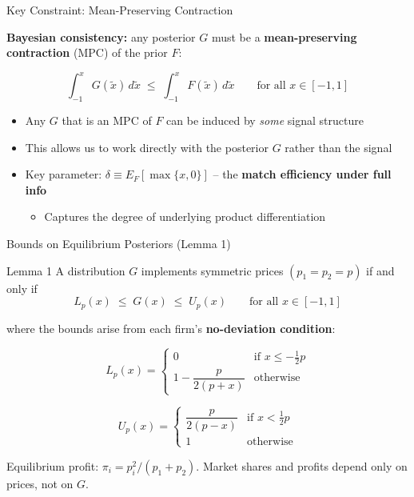 \documentclass[aspectratio=169, 11pt]{beamer}
\begin{document}
\begin{frame}{Key Constraint: Mean-Preserving Contraction}

\textbf{Bayesian consistency:} any posterior $G$ must be a \textbf{mean-preserving contraction} (MPC) of the prior $F$:

$$\int_{-1}^{x} G(\tilde{x})\, d\tilde{x} \;\leq\; \int_{-1}^{x} F(\tilde{x})\, d\tilde{x} \qquad \text{for all } x \in [-1,1]$$

\bigskip

\begin{itemize}
    \item Any $G$ that is an MPC of $F$ can be induced by \emph{some} signal structure

    \medskip

    \item This allows us to work directly with the posterior $G$ rather than the signal

    \medskip

    \item Key parameter: $\delta \equiv E_F[\max\{x, 0\}]$ -- the \textbf{match efficiency under full info}
    \begin{itemize}
        \item Captures the degree of underlying product differentiation
    \end{itemize}
\end{itemize}

\end{frame}

\begin{frame}{Bounds on Equilibrium Posteriors (Lemma 1)}

\begin{block}{Lemma 1}
A distribution $G$ implements symmetric prices $(p_1 = p_2 = p)$ if and only if
$$L_p(x) \;\leq\; G(x) \;\leq\; U_p(x) \qquad \text{for all } x \in [-1,1]$$
\end{block}

\medskip

where the bounds arise from each firm's \textbf{no-deviation condition}:

$$L_p(x) = \begin{cases} 0 & \text{if } x \leq -\tfrac{1}{2}p \\ 1 - \dfrac{p}{2(p+x)} & \text{otherwise} \end{cases}$$

$$U_p(x) = \begin{cases} \dfrac{p}{2(p-x)} & \text{if } x < \tfrac{1}{2}p \\ 1 & \text{otherwise} \end{cases}$$

\medskip

\small
Equilibrium profit: $\pi_i = p_i^2/(p_1 + p_2)$. \; Market shares and profits depend only on prices, not on $G$.

\end{frame}
\end{document}
